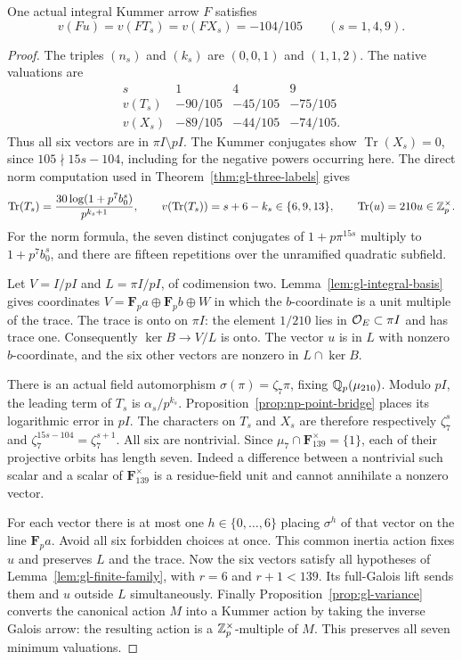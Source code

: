 \begin{lemma}
\label{lem:np-six}
One actual integral Kummer arrow $F$ satisfies
\[
           v(Fu)=v(FT_s)=v(FX_s)=-104/105
                  \qquad(s=1,4,9).
\]
\end{lemma}
\begin{proof}
The triples $(n_s)$ and $(k_s)$ are $(0,0,1)$ and $(1,1,2)$.
The native valuations are
\[
 \begin{array}{c|ccc}
 s&1&4&9\\ \hline
 v(T_s)&-90/105&-45/105&-75/105\\
 v(X_s)&-89/105&-44/105&-74/105 .
 \end{array}
\]
Thus all six vectors are in $\pi I\setminus pI$.
The Kummer conjugates show $\operatorname{Tr}(X_s)=0$, since
$105\nmid15s-104$, including for the negative powers occurring
here. The direct norm computation used in
Theorem~\ref{thm:gl-three-labels} gives
\[
 \operatorname{Tr}(T_s)
     =\frac{30\log(1+p^7b_0^s)}{p^{k_s+1}},\qquad
 v(\operatorname{Tr}(T_s))=s+6-k_s\in\{6,9,13\},
 \qquad\operatorname{Tr}(u)=210u\in\mathbb Z_p^\times.
\]
For the norm formula, the seven distinct conjugates of
$1+p\pi^{15s}$ multiply to $1+p^7b_0^s$, and there are
fifteen repetitions over the unramified quadratic subfield.

Let $V=I/pI$ and $L=\pi I/pI$, of codimension two.
Lemma~\ref{lem:gl-integral-basis} gives coordinates
$V=\mathbf F_p a\oplus\mathbf F_p b\oplus W$ in which
the $b$-coordinate is a unit multiple of the trace.
The trace is onto on $\pi I$: the element $1/210$ lies in
$\mathcal O_E\subset\pi I$ and has trace one. Consequently
$\ker B\to V/L$ is onto. The vector $u$ is in $L$ with nonzero
$b$-coordinate, and the six other vectors are nonzero in
$L\cap\ker B$.

There is an actual field automorphism
$\sigma(\pi)=\zeta_7\pi$, fixing $\mathbb Q_p(\mu_{210})$.
Modulo $pI$, the leading term of $T_s$ is
$\alpha_s/p^{k_s}$. Proposition~\ref{prop:np-point-bridge}
places its logarithmic error in $pI$. The characters on
$T_s$ and $X_s$ are therefore respectively
$\zeta_7^s$ and $\zeta_7^{15s-104}=\zeta_7^{s+1}$.
All six are nontrivial. Since
$\mu_7\cap\mathbf F_{139}^\times=\{1\}$, each of their
projective orbits has length seven. Indeed a difference
between a nontrivial such scalar and a scalar of
$\mathbf F_{139}^\times$ is a residue-field unit and
cannot annihilate a nonzero vector.

For each vector there is at most one
$h\in\{0,\ldots,6\}$ placing $\sigma^h$ of that vector on
the line $\mathbf F_p a$. Avoid all six forbidden choices
at once. This common inertia action fixes $u$ and preserves
$L$ and the trace. Now the six vectors satisfy all hypotheses
of Lemma~\ref{lem:gl-finite-family}, with $r=6$ and
$r+1<139$. Its full-Galois lift sends them and $u$ outside
$L$ simultaneously. Finally
Proposition~\ref{prop:gl-variance} converts the canonical
action $M$ into a Kummer action by taking the inverse
Galois arrow: the resulting action is a $\mathbb Z_p^\times$-multiple
of $M$. This preserves all seven minimum valuations.
\end{proof}

